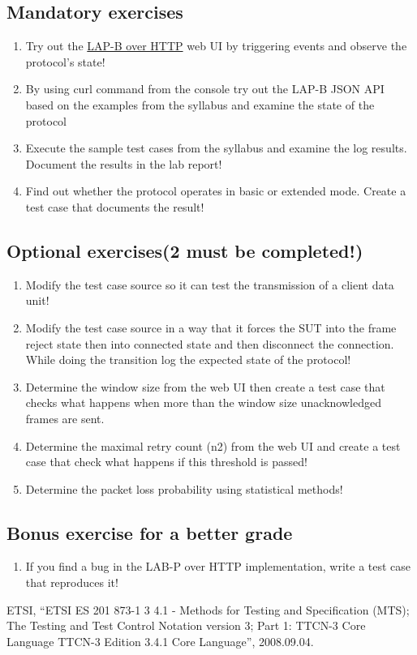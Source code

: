 \documentclass[a4paper]{article}
\begin{document}
\subsection{Mandatory exercises}
\begin{enumerate}
    \item Try out the \href{http://152.66.246.231:3000/}{LAP-B over HTTP} web UI by triggering events and observe the protocol's state!
    \item By using curl command from the console try out the LAP-B JSON API based on the examples from the syllabus and examine the state of the protocol
    \item Execute the sample test cases from the syllabus and examine the log results. Document the results in the lab report!
    \item Find out whether the protocol operates in basic or extended mode. Create a test case that documents the result! 
\end{enumerate}

\subsection{Optional exercises(2 must be completed!)}
\begin{enumerate}[resume]
    \item Modify the test case source so it can test the transmission of a client data unit!
    \item Modify the test case source in a way that it forces the SUT into the frame reject state then into connected state and then disconnect the connection. While doing the transition log the expected state of the protocol!
    \item Determine the window size from the web UI then create a test case that checks what happens when more than the window size unacknowledged frames are sent. 
    \item Determine the maximal retry count (n2) from the web UI and create a test case that check what happens if this threshold is passed!
    \item Determine the packet loss probability using statistical methods!
\end{enumerate}

\subsection{Bonus exercise for a better grade}
\begin{enumerate}[resume]
  \item If you find a bug in the LAB-P over HTTP implementation, write a test case that reproduces it!
\end{enumerate}

\begin{thebibliography}{9}

    ETSI,
    ``{ETSI} {ES} 201 873-1 3 4.1 - Methods for Testing and Specification ({MTS}); The
    Testing and Test Control Notation version 3; Part 1: {TTCN-3} Core Language {TTCN-3}
    Edition 3.4.1 Core Language'',
    2008.09.04.
\end{thebibliography}
\end{document}
